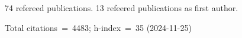 74 refereed publications. 13 refeered publications as first author.

Total citations~=~4483; h-index~=~35 (2024-11-25)